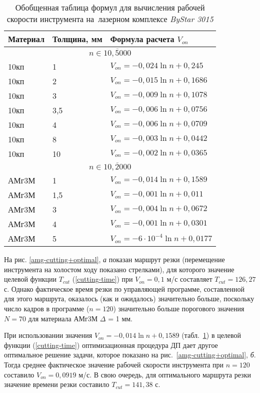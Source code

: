 \begin{table}[H]
  \caption{
    Обобщенная таблица формул
    для вычисления рабочей скорости инструмента
    на~лазерном комплексе
    {\it ByStar 3015}
    }
  \label{v-formulae}
  \centering
  \begin{tabular}{l|l|l}
    \hline
    Материал & Толщина, мм & Формула расчета $V_{on}$ \\
    \hline
    \multicolumn{3}{c}{$n\in\overline{10,5000}$} \\
    10кп & 1 & $V_{on} = -0,024 \ln n+0,245$ \\
    10кп & 2 & $V_{on} = -0,015 \ln n+0,1686$ \\
    10кп & 3 & $V_{on} = -0,009 \ln n+0,1078$ \\
    10кп & 3,5 & $V_{on} = -0,006 \ln n+0,0756$ \\
    10кп & 4 & $V_{on} = -0,006 \ln n+0,0709$ \\
    10кп & 8 & $V_{on} = -0,003 \ln n+0,0442$ \\
    10кп & 10 & $V_{on} = -0,002 \ln n+0,0365$ \\
    \multicolumn{3}{c}{$n\in\overline{10,2000}$} \\
    АМг3М & 1 & $V_{on} = -0,014 \ln n+0,1589$ \\
    АМг3М & 1,5 & $V_{on} = -0,001 \ln n+0,011$ \\
    АМг3М & 3 & $V_{on} = -0,004 \ln n+0,0672$ \\
    АМг3М & 4 & $V_{on} = -0,001 \ln n+0,0301$ \\
    АМг3М & 5 & $V_{on} = -6\cdot 10^{-4} \ln n+0,0177$ \\
    \hline
  \end{tabular}
\end{table}

На рис. \ref{amg-cutting+optimal}, {\it а}
показан маршрут резки
(перемещение инструмента на холостом ходу показано стрелками),
для которого значение целевой функции
$T_{cut}$ (\ref{cutting-time})
при
$V_{on}=0,1$ м/с
составляет
$T_{cut}=126,27$ с.
Однако фактическое время резки по управляющей программе,
составленной для этого маршрута,
оказалось (как и ожидалось)
значительно больше,
поскольку число кадров в программе ($n=120$)
значительно больше порогового значения $N=70$
для материала
АМг3М
$\Delta$ = 1 мм.

При использовании значения
$V_{on}=-0,014 \ln n + 0,1589$
(табл.~\ref{v-formulae})
в целевой функции (\ref{cutting-time})
оптимизационная процедура ДП
дает другое оптимальное решение задачи,
которое показано на рис.~\ref{amg-cutting+optimal}, {\it б}.
Тогда среднее фактическое значение
рабочей скорости инструмента при $n=120$
составило
$V_{on}=0,0919$ м/с.
В свою очередь,
для оптимального маршрута резки значение времени резки составило
$T_{cut}=141,38$ с.

